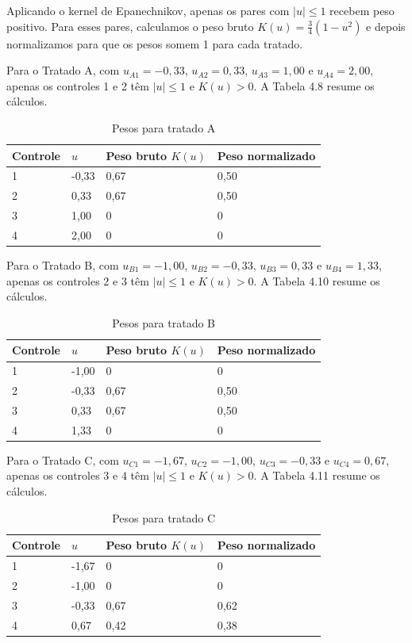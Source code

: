 Aplicando o kernel de Epanechnikov, apenas os pares com $|u| \leq 1$ recebem peso positivo. Para esses pares, calculamos o peso bruto $K(u) = \frac{3}{4} (1-u^2)$ e depois normalizamos para que os pesos somem 1 para cada tratado.

Para o Tratado A, com $u_{A1} = -0,33$, $u_{A2} = 0,33$, $u_{A3} = 1,00$ e $u_{A4} = 2,00$, apenas os controles 1 e 2 têm $|u| \leq 1$ e $K(u) > 0$. A Tabela 4.8 resume os cálculos.

\begin{table}[h]
    \centering
    \begin{tabular}{llll}
        Controle & $u$ & Peso bruto $K(u)$ & Peso normalizado\\\midrule
        1 & -0,33 & 0,67 & 0,50\\
        2 & 0,33 & 0,67 & 0,50\\
        3 & 1,00 & 0 & 0\\
        4 & 2,00 & 0 & 0\\\bottomrule
    \end{tabular}
    \caption{Pesos para tratado A}
    \label{tab:placeholder}
\end{table}

Para o Tratado B, com $u_{B1} = -1,00$, $u_{B2} = -0,33$, $u_{B3} = 0,33$ e $u_{B4} = 1,33$, apenas os controles 2 e 3 têm $|u| \leq 1$ e $K(u) > 0$. A Tabela 4.10 resume os cálculos.

\begin{table}[h]
    \centering
    \begin{tabular}{llll}
        Controle & $u$ & Peso bruto $K(u)$ & Peso normalizado\\\midrule
        1 & -1,00 & 0 & 0\\
        2 & -0,33 & 0,67 & 0,50\\
        3 & 0,33 & 0,67 & 0,50\\
        4 & 1,33 & 0 & 0\\\bottomrule
    \end{tabular}
    \caption{Pesos para tratado B}
    \label{tab:placeholder}
\end{table}

Para o Tratado C, com $u_{C1} = -1,67$, $u_{C2} = -1,00$, $u_{C3} = -0,33$ e $u_{C4} = 0,67$, apenas os controles 3 e 4 têm $|u| \leq 1$ e $K(u) > 0$. A Tabela 4.11 resume os cálculos.

\begin{table}[h]
    \centering
    \begin{tabular}{llll}
        Controle & $u$ & Peso bruto $K(u)$ & Peso normalizado\\\midrule
        1 & -1,67 & 0 & 0\\
        2 & -1,00 & 0 & 0\\
        3 & -0,33 & 0,67 & 0,62\\
        4 & 0,67 & 0,42 & 0,38\\\bottomrule
    \end{tabular}
    \caption{Pesos para tratado C}
    \label{tab:placeholder}
\end{table}

